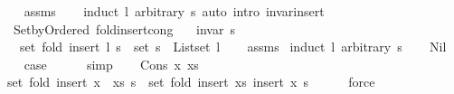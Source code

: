 \begin{isabellebody}
\endisataginvisible
{\isafoldinvisible}%
%
\isadeliminvisible
\isanewline
%
\endisadeliminvisible
%
\isadelimproof
\ \ %
\endisadelimproof
%
\isatagproof
{}\isamarkupfalse%
\ assms\isanewline
\ \ \isamarkupfalse%
\ {\isacharparenleft}{\kern0pt}induct\ l\ arbitrary{\isacharcolon}{\kern0pt}\ s{\isacharparenright}{\kern0pt}\ {\isacharparenleft}{\kern0pt}auto\ intro{\isacharcolon}{\kern0pt}\ invar{\isacharunderscore}{\kern0pt}insert{\isacharparenright}{\kern0pt}%
\endisatagproof
{\isafoldproof}%
%
\isadelimproof
\isanewline
%
\endisadelimproof
%
\isadeliminvisible
\isanewline
%
\endisadeliminvisible
%
\isataginvisible
{}\isamarkupfalse%
\ {\isacharparenleft}{\kern0pt}\ Set{\isacharunderscore}{\kern0pt}by{\isacharunderscore}{\kern0pt}Ordered{\isacharparenright}{\kern0pt}\ fold{\isacharunderscore}{\kern0pt}insert{\isacharunderscore}{\kern0pt}cong{\isacharcolon}{\kern0pt}\isanewline
\ \ \ {\isachardoublequoteopen}invar\ s{\isachardoublequoteclose}\isanewline
\ \ \ {\isachardoublequoteopen}set\ {\isacharparenleft}{\kern0pt}fold\ insert\ l\ s{\isacharparenright}{\kern0pt}\ {\isacharequal}{\kern0pt}\ set\ s\ {\isasymunion}\ List{\isachardot}{\kern0pt}set\ l{\isachardoublequoteclose}%
\endisataginvisible
{\isafoldinvisible}%
%
\isadeliminvisible
\isanewline
%
\endisadeliminvisible
%
\isadelimproof
\ \ %
\endisadelimproof
%
\isatagproof
{}\isamarkupfalse%
\ assms\isanewline
{}\isamarkupfalse%
\ {\isacharparenleft}{\kern0pt}induct\ l\ arbitrary{\isacharcolon}{\kern0pt}\ s{\isacharparenright}{\kern0pt}\isanewline
\ \ \isamarkupfalse%
\ Nil\isanewline
\ \ \isamarkupfalse%
\ {\isacharquery}{\kern0pt}case\isanewline
\ \ \ \ \isamarkupfalse%
\ simp\isanewline
{}\isamarkupfalse%
\isanewline
\ \ \isamarkupfalse%
\ {\isacharparenleft}{\kern0pt}Cons\ x\ xs{\isacharparenright}{\kern0pt}\isanewline
\ \ \isamarkupfalse%
\ {\isachardoublequoteopen}set\ {\isacharparenleft}{\kern0pt}fold\ insert\ {\isacharparenleft}{\kern0pt}x\ {\isacharhash}{\kern0pt}\ xs{\isacharparenright}{\kern0pt}\ s{\isacharparenright}{\kern0pt}\ {\isacharequal}{\kern0pt}\ set\ {\isacharparenleft}{\kern0pt}fold\ insert\ xs\ {\isacharparenleft}{\kern0pt}insert\ x\ s{\isacharparenright}{\kern0pt}{\isacharparenright}{\kern0pt}{\isachardoublequoteclose}\isanewline
\ \ \ \ \isamarkupfalse%
\ force\isanewline
\ \ \isamarkupfalse%
\ \isamarkupfalse%

\end{isabellebody}
